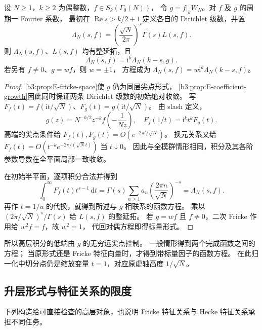\begin{theorem}\label{b3:thm:E-fricke-functional}
设 \(N\ge1\)，\(k\ge2\) 为偶整数，\(f\in S_k(\Gamma_0(N))\)，
令 \(g=f|_kW_N\)。对 \(f\) 及 \(g\) 的周期一 Fourier 系数，
最初在 \(\operatorname{Re}s>k/2+1\) 定义各自的 Dirichlet 级数，并置
\[
 \Lambda_N(s,f)=\left(\frac{\sqrt N}{2\pi}\right)^s\Gamma(s)L(s,f).
\]
则 \(\Lambda_N(s,f)\)、\(L(s,f)\) 均有整延拓，且
\[
 \Lambda_N(s,f)=\mathrm i^k\Lambda_N(k-s,g).
\]
若另有 \(f\ne0\)、\(g=w f\)，则 \(w=\pm1\)，
方程成为 \(\Lambda_N(s,f)=w\mathrm i^k\Lambda_N(k-s,f)\)。
\end{theorem}
\begin{proof}
\cref{b3:prop:E-fricke-space}使 \(g\) 仍为同层尖点形式，
\cref{b3:prop:E-coefficient-growth}因此同时保证两条 Dirichlet 级数的初始绝对收敛。
写 \(F_f(t)=f(\mathrm i t/\sqrt N)\)、\(F_g(t)=g(\mathrm i t/\sqrt N)\)。
由 slash 定义，
\[
 g(z)=N^{-k/2}z^{-k}f\left(-\frac1{Nz}\right),
 \quad F_f(1/t)=\mathrm i^k t^k F_g(t).
\]
高端的尖点条件给 \(F_f(t),F_g(t)=O(e^{-2\pi t/\sqrt N})\)。
换元关系又给 \(F_f(t)=O(t^{-k}e^{-2\pi/(\sqrt N t)})\) 当 \(t\downarrow0\)。
因此与全模群情形相同，积分及其各阶参数导数在全平面局部一致收敛。

在初始半平面，逐项积分合法并得到
\[
 \int_0^\infty F_f(t)t^{s-1}\,\mathrm dt
 =\Gamma(s)\sum_{n\ge1}a_n
                 \left(\frac{2\pi n}{\sqrt N}\right)^{-s}
 =\Lambda_N(s,f).
\]
再作 \(t=1/u\) 的代换，就得到所述与 \(g\) 相联系的函数方程。
乘以 \((2\pi/\sqrt N)^s/\Gamma(s)\) 给 \(L(s,f)\) 的整延拓。
若 \(g=w f\) 且 \(f\ne0\)，二次 Fricke 作用给 \(w^2f=f\)，故 \(w^2=1\)，
代回对偶方程即得标量形式。
\end{proof}
所以高层积分的低端由 \(g\) 的无穷远尖点控制。
一般情形得到两个完成函数之间的方程；
当原形式还是 Fricke 特征向量时，才得到带标量因子的函数方程。
在此归一化中切分点仍是缩放变量 \(t=1\)，对应原虚轴高度 \(1/\sqrt N\)。

\subsection{升层形式与特征关系的限度}
\label{b3:subsec:E0404}

下列构造给可直接检查的高层对象，也说明 Fricke 特征关系与 Hecke 特征关系承担不同任务。

